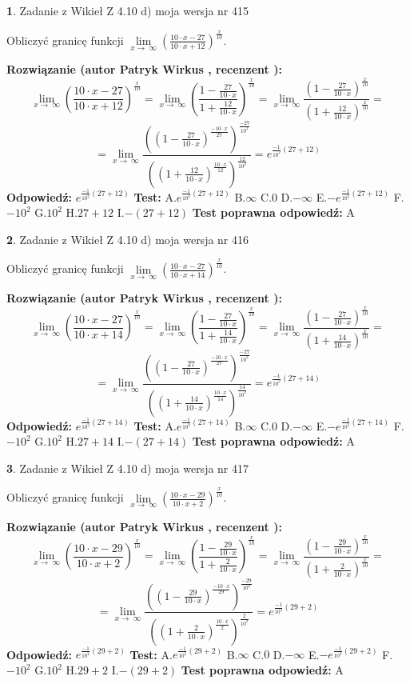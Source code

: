 \documentclass[12pt, a4paper]{article}
\theoremstyle{definition} %
\newtheorem{zad}{}
\newcommand{\zadStart}[1]{\begin{zad}#1\newline}
\newcommand{\zadStop}{\end{zad}}
\newcommand{\rozwStart}[2]{\noindent \textbf{Rozwiązanie (autor #1 , recenzent #2): }\newline}
\newcommand{\rozwStop}{\newline}
\newcommand{\odpStart}{\noindent \textbf{Odpowiedź:}\newline}
\newcommand{\odpStop}{\newline}
\newcommand{\testStart}{\noindent \textbf{Test:}\newline}
\newcommand{\testStop}{\newline}
\newcommand{\kluczStart}{\noindent \textbf{Test poprawna odpowiedź:}\newline}
\newcommand{\kluczStop}{\newline}
\begin{document}
\zadStart{Zadanie z Wikieł Z 4.10 d) moja wersja nr 415}


Obliczyć granicę funkcji  $\lim\limits_{x\to\ \infty}(\frac{10\cdot x-27}{10\cdot x+12})^{\frac{x}{10}}$.
\zadStop
\rozwStart{Patryk Wirkus}{}
$$\lim\limits_{x\to\ \infty}(\frac{10\cdot x-27}{10\cdot x+12})^{\frac{x}{10}} = \lim\limits_{x\to\ \infty}(\frac{1-\frac{27}{10\cdot x}}{1+\frac{12}{10\cdot x}})^{\frac{x}{10}}=\lim\limits_{x\to\ \infty}\frac{(1-\frac{27}{10\cdot x})^{\frac{x}{10}}}{(1+\frac{12}{10\cdot x})^{\frac{x}{10}}}=$$
$$=\lim\limits_{x\to\ \infty}\frac{((1-\frac{27}{10\cdot x})^{\frac{-10\cdot x}{27}})^{\frac{-27}{10^{2}}}}{((1+\frac{12}{10\cdot x})^{\frac{10\cdot x}{12}})^{\frac{12}{10^{2}}}}=e^{\frac{-1}{10^{2}}(27+12)}$$
\rozwStop
\odpStart
$e^{\frac{-1}{10^{2}}(27+12)}$
\odpStop
\testStart
A.$e^{\frac{-1}{10^{2}}(27+12)}$ B.$\infty$ C.$0$ D.$-\infty$ E.$-e^{\frac{-1}{10^{2}}(27+12)}$
F.$-10^{2}$ G.$10^{2}$
H.$27+12$
I.$-(27+12)$
\testStop
\kluczStart
A
\kluczStop



\zadStart{Zadanie z Wikieł Z 4.10 d) moja wersja nr 416}


Obliczyć granicę funkcji  $\lim\limits_{x\to\ \infty}(\frac{10\cdot x-27}{10\cdot x+14})^{\frac{x}{10}}$.
\zadStop
\rozwStart{Patryk Wirkus}{}
$$\lim\limits_{x\to\ \infty}(\frac{10\cdot x-27}{10\cdot x+14})^{\frac{x}{10}} = \lim\limits_{x\to\ \infty}(\frac{1-\frac{27}{10\cdot x}}{1+\frac{14}{10\cdot x}})^{\frac{x}{10}}=\lim\limits_{x\to\ \infty}\frac{(1-\frac{27}{10\cdot x})^{\frac{x}{10}}}{(1+\frac{14}{10\cdot x})^{\frac{x}{10}}}=$$
$$=\lim\limits_{x\to\ \infty}\frac{((1-\frac{27}{10\cdot x})^{\frac{-10\cdot x}{27}})^{\frac{-27}{10^{2}}}}{((1+\frac{14}{10\cdot x})^{\frac{10\cdot x}{14}})^{\frac{14}{10^{2}}}}=e^{\frac{-1}{10^{2}}(27+14)}$$
\rozwStop
\odpStart
$e^{\frac{-1}{10^{2}}(27+14)}$
\odpStop
\testStart
A.$e^{\frac{-1}{10^{2}}(27+14)}$ B.$\infty$ C.$0$ D.$-\infty$ E.$-e^{\frac{-1}{10^{2}}(27+14)}$
F.$-10^{2}$ G.$10^{2}$
H.$27+14$
I.$-(27+14)$
\testStop
\kluczStart
A
\kluczStop



\zadStart{Zadanie z Wikieł Z 4.10 d) moja wersja nr 417}


Obliczyć granicę funkcji  $\lim\limits_{x\to\ \infty}(\frac{10\cdot x-29}{10\cdot x+2})^{\frac{x}{10}}$.
\zadStop
\rozwStart{Patryk Wirkus}{}
$$\lim\limits_{x\to\ \infty}(\frac{10\cdot x-29}{10\cdot x+2})^{\frac{x}{10}} = \lim\limits_{x\to\ \infty}(\frac{1-\frac{29}{10\cdot x}}{1+\frac{2}{10\cdot x}})^{\frac{x}{10}}=\lim\limits_{x\to\ \infty}\frac{(1-\frac{29}{10\cdot x})^{\frac{x}{10}}}{(1+\frac{2}{10\cdot x})^{\frac{x}{10}}}=$$
$$=\lim\limits_{x\to\ \infty}\frac{((1-\frac{29}{10\cdot x})^{\frac{-10\cdot x}{29}})^{\frac{-29}{10^{2}}}}{((1+\frac{2}{10\cdot x})^{\frac{10\cdot x}{2}})^{\frac{2}{10^{2}}}}=e^{\frac{-1}{10^{2}}(29+2)}$$
\rozwStop
\odpStart
$e^{\frac{-1}{10^{2}}(29+2)}$
\odpStop
\testStart
A.$e^{\frac{-1}{10^{2}}(29+2)}$ B.$\infty$ C.$0$ D.$-\infty$ E.$-e^{\frac{-1}{10^{2}}(29+2)}$
F.$-10^{2}$ G.$10^{2}$
H.$29+2$
I.$-(29+2)$
\testStop
\kluczStart
A
\kluczStop
\end{document}
